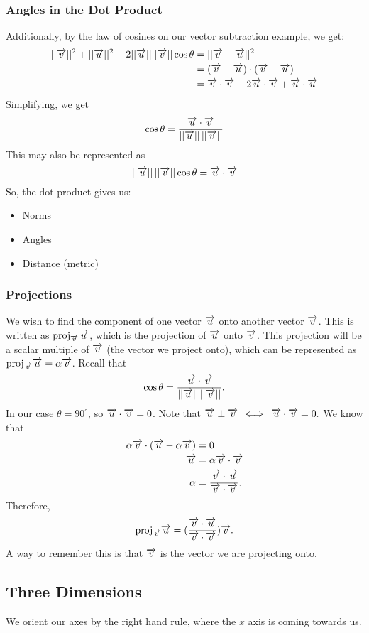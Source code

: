 \documentclass[12pt]{article}
\theoremstyle{plain} %
\theoremstyle{definition}
\theoremstyle{definition}
\theoremstyle{definition}
\theoremstyle{remark}
\newcommand{\vecv}{\vv{v}}
\newcommand{\vecu}{\vv{u}}
\newcommand*{\vv}[1]{\overrightarrow{\mkern0mu#1}}
\begin{document}
\subsubsection{Angles in the Dot Product}
Additionally, by the law of cosines on our vector subtraction example, we get:
\begin{align*}
||\vv{v}||^2 + ||\vv{u}||^2 - 2||\vv{u}|| ||\vv{v}|| \cos{\theta} & = ||\vv{v}-\vv{u}||^2 \\
& = (\vv{v}-\vv{u})\cdot(\vv{v}-\vv{u}) \\
& = \vv{v} \cdot \vv{v} - 2 \vv{u} \cdot \vv{v} + \vv{u} \cdot \vv{u}
\end{align*}
Simplifying, we get
    \[\cos{\theta} = \frac{\vv{u} \cdot \vv{v}}{||\vv{u}|| \, ||\vv{v}||}\]
This may also be represented as
\[ ||\vv{u}|| \, ||\vv{v}|| \cos{\theta} = \vv{u} \cdot \vv{v} \]
So, the dot product gives us:
\begin{itemize}
    \item Norms
    \item Angles
    \item Distance (metric)
\end{itemize}

\subsubsection{Projections}
We wish to find the component of one vector $\vv{u}$ onto another vector $\vv{v}$.
This is written as $\text{proj}_{\vv{v}}\vv{u}$, which is the projection of $\vecu$ onto $\vecv$.
This projection will be a scalar multiple of $\vecv$ (the vector we project onto),
which can be represented as $\text{proj}_{\vv{v}}\vv{u} = \alpha \vecv$.
Recall that
\[\cos{\theta} = \frac{\vv{u} \cdot \vv{v}}{||\vv{u}|| \, ||\vv{v}||}.\]
In our case $\theta=90^\circ$, so $\vecu \cdot \vecv = 0$.
Note that $\vecu \perp \vecv \: \iff \: \vecu \cdot \vecv = 0.$
We know that
\begin{align*}
    \alpha \vecv \cdot (\vecu - \alpha \vecv) & = 0 \\
    \vecu & = \alpha \vecv \cdot \vecv \\
    \alpha &= \frac{\vecv \cdot \vecu}{\vecv \cdot \vecv}.
\end{align*}
Therefore,
\[ \text{proj}_{\vecv} \vecu = (\frac{\vecv \cdot \vecu}{\vecv \cdot \vecv})\vecv .\]
A way to remember this is that $\vecv$ is the vector we are projecting onto.

\subsection{Three Dimensions}
We orient our axes by the right hand rule, where the $x$ axis is coming towards us.
\end{document}
